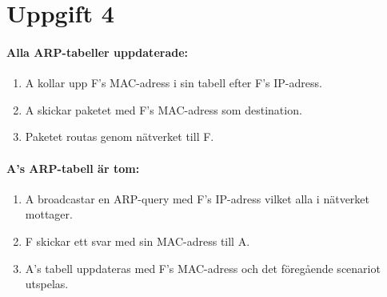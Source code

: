 \section{Uppgift 4}
\paragraph{Alla ARP-tabeller uppdaterade:}
\begin{enumerate}
    \item A kollar upp F's MAC-adress i sin tabell efter F's IP-adress.
    \item A skickar paketet med F's MAC-adress som destination.
    \item Paketet routas genom nätverket till F.
\end{enumerate}
\paragraph{A's ARP-tabell är tom:}
\begin{enumerate}
    \item A broadcastar en ARP-query med F's IP-adress vilket alla i nätverket mottager.
    \item F skickar ett svar med sin MAC-adress till A.
    \item A's tabell uppdateras med F's MAC-adress och det föregående scenariot utspelas.
\end{enumerate}
